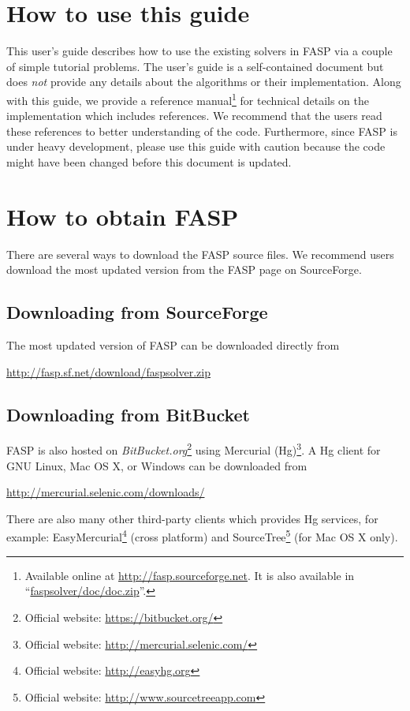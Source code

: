 \documentclass[11pt]{memoir}
\begin{document}
\section{How to use this guide}\label{sec:how}

This user's guide describes how to use the existing solvers in FASP
via a couple of simple tutorial problems. The user's guide is a
self-contained document but does \emph{not} provide any details about
the algorithms or their implementation. Along with this guide, we provide a
reference manual\footnote{Available online at
  \url{http://fasp.sourceforge.net}. It is also available in
  ``\url{faspsolver/doc/doc.zip}''.} for technical details on the
implementation which includes references. We recommend that the users
read these references to better
understanding of the code. Furthermore, since FASP is under heavy
development, please use this guide with caution because the code might
have been changed before this document is updated.


\section{How to obtain FASP}\label{sec:install}

There are several ways to download the FASP source files. We recommend users download the most updated version from the FASP page on SourceForge. 

\subsection{Downloading from SourceForge}

The most updated version of FASP can be downloaded directly from
%
\begin{center}
\url{http://fasp.sf.net/download/faspsolver.zip}
\end{center}
%

\subsection{Downloading from BitBucket}

FASP is also hosted on
\emph{BitBucket.org}\footnote{Official website:
  \url{https://bitbucket.org/}} using Mercurial (Hg)\footnote{Official
  website: \url{http://mercurial.selenic.com/}}. A Hg client for GNU
Linux, Mac OS X, or Windows can be downloaded from
\begin{center}
  \url{http://mercurial.selenic.com/downloads/}
\end{center}
%
There are also many other third-party clients which provides Hg services, for example: EasyMercurial\footnote{Official website: \url{http://easyhg.org}} (cross platform) and SourceTree\footnote{Official website: \url{http://www.sourcetreeapp.com}} (for Mac OS X only).
\end{document}
